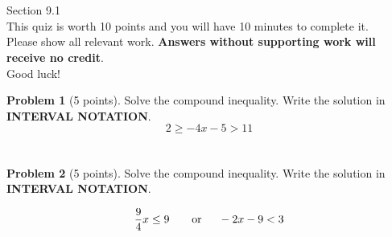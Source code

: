 \documentclass[11pt]{article}
\theoremstyle{definition}
\newtheorem{problem}{Problem}
\begin{document}
\section*{}
Section 9.1\\
This quiz is worth 10 points and you will have 10 minutes to complete it.\\
Please show all relevant work. \textbf{Answers without supporting work will receive no credit}.\\
Good luck!
\begin{problem}[5 points] Solve the compound inequality. Write the solution in \textbf{INTERVAL NOTATION}.
\[2\geq -4x-5>11 \]


\end{problem}

\vspace{2in}

\section*{}
\begin{problem}[5 points] Solve the compound inequality. Write the solution in \textbf{INTERVAL NOTATION}.

\[\frac{9}{4}x\leq 9 \hspace{2em} \text{or}\hspace{1.5em} -2x-9<3 \]

\end{problem}
\end{document}
